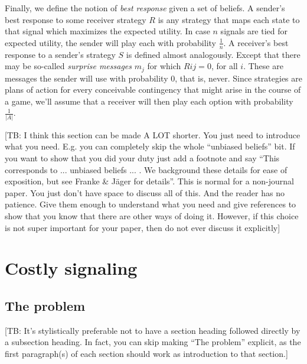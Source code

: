 \documentclass[10pt]{article}
\newcommand{\tb}[1]{\textcolor[rgb]{.8,.33,.0}{[TB: #1]}}%
\begin{document}
Finally, we define the notion of \textit{best response} given a set of beliefs. A sender's best response to some receiver strategy $R$ is any strategy that maps each state to that signal which maximizes the expected utility. In case $n$ signals are tied for expected utility, the sender will play each with probability $\tfrac{1}{n}$.
A receiver's best response to a sender's strategy $S$ is defined almost analogously. Except that there may be so-called \textit{surprise messages} $m_j$ for which $R{ij}=0$, for all $i$. These are messages the sender will use with probability 0, that is, never. Since strategies are plans of action for every conceivable contingency that might arise in the course of a game, we'll assume that a receiver will then play each option with probability $\tfrac{1}{|A|}$.

\tb{I think this section can be made A LOT shorter. You just need to introduce what you need. E.g. you can completely skip the whole ``unbiased beliefs'' bit. If you want to show that you did your duty just add a footnote and say ``This corresponds to ... unbiased beliefs ... . We background these details for ease of exposition, but see Franke \& J\"ager for details''. This is normal for a non-journal paper. You just don't have space to discuss all of this. And the reader has no patience. Give them enough to understand what you need and give references to show that you know that there are other ways of doing it. However, if this choice is not super important for your paper, then do not ever discuss it explicitly}

\section{Costly signaling}
\subsection{The problem}
\tb{It's stylistically preferable not to have a section heading followed directly by a subsection heading. In fact, you can skip making ``The problem'' explicit, as the first paragraph(s) of each section should work as introduction to that section.}
\end{document}
